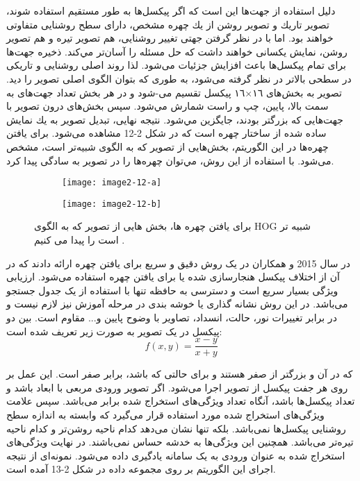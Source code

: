 \noindent
دليل استفاده از جهت‌ها این است که اگر پیکسل‌ها به طور مستقيم استفاده شوند، تصوير تاريك و تصوير روشن از يك چهره مشخص، دارای سطح روشنایی متفاوتى خواهند بود. اما با در نظر گرفتن جهتى تغییر روشنايى، هم تصوير تيره و هم تصوير روشن، نمايش يكسانى خواهند داشت كه حل مسئله را آسان‌تر مي‌كند.
ذخيره جهت‌ها براى تمام پیکسل‌ها باعث افزایش جزئيات می‌شود. لذا روند اصلى روشنايى و تاريكى در سطحی بالاتر در نظر گرفته می‌شود، به طورى كه بتوان الگوى اصلى تصوير را ديد. تصوير به بخش‌هاى ١٦×١٦ پيكسل تقسیم می-شود و در هر بخش تعداد جهت‌هاى به سمت بالا، پايين، چپ و راست شمارش مي‌شود. سپس بخش‌هاى درون تصوير با جهت‌هايى كه بزرگتر بودند، جايگزين مي‌شود. نتيجه نهايى، تبديل تصوير به يك نمايش ساده شده از ساختار چهره است که در شکل 2-12 مشاهده می‌شود. براى يافتن چهره‌ها در این الگوریتم، بخش‌هايى از تصوير كه به الگوى  شبيه‌تر است، مشخص می‌شود. با استفاده از اين روش، مي‌توان چهره‌ها را در تصویر به سادگى پيدا كرد.

\begin{figure}
\begin{subfigure}{.5\textwidth}
  \centering
  \texttt{[image: image2-12-a]}
  \label{image2-12-a}
\end{subfigure}
\begin{subfigure}{.5\textwidth}
  \centering
  \texttt{[image: image2-12-b]}
  \label{image2-12-b}
\end{subfigure}
  \caption{براى يافتن چهره ها، بخش هايى از تصوير كه به الگوى HOG شبيه تر است را پيدا می كنيم \cite{ref1}.}
\label{fig:image2-12}
\end{figure}

در سال 2015  و همکاران در \cite{7130626} یک روش دقیق و سریع برای یافتن چهره ارائه دادند که در آن از اختلاف پیکسل هنجارسازی شده یا  برای یافتن چهره استفاده می‌شود. ارزیابی ویژگی  بسیار سریع است و دسترسی به حافظه تنها با استفاده از یک جدول جستجو می‌باشد. در این روش نشانه گذاری یا خوشه بندی در مرحله آموزش نیز لازم نیست و در برابر تغییرات نور، حالت، انسداد، تصاویر با وضوح پایین و... مقاوم است.  بین دو پیکسل در یک تصویر به صورت زیر تعریف شده است:
\begin{equation}\label{eq2-6}
f(x,y) = \frac{x - y}{x + y}
\end{equation}

\noindent
که در آن  و  بزرگتر از صفر هستند و  برای حالتی که  باشد، برابر صفر است. این عمل بر روی هر جفت پیکسل از تصویر اجرا می‌شود. اگر تصویر ورودی مربعی با ابعاد  باشد و  تعداد پیکسل‌ها باشد، آنگاه تعداد ویژگی‌های استخراج شده برابر  می‌باشد. سپس علامت  ویژگی‌های استخراج شده مورد استفاده قرار می‌گیرد که وابسته به اندازه سطح روشنایی پیکسل‌ها نمی‌باشد. بلکه تنها نشان می‌دهد کدام ناحیه روشن‌تر و کدام ناحیه تیره‌تر می‌باشد. همچنین این ویژگی‌ها به خدشه حساس نمی‌باشند. در نهایت ویژگی‌های استخراج شده به عنوان ورودی به یک سامانه یادگیری داده می‌شود. نمونه‌ای از نتیجه اجرای این الگوریتم بر روی مجموعه داده  در شکل 2-13 آمده است.
 
